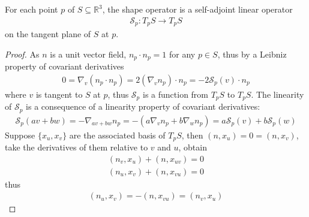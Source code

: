 \documentclass[10pt]{article}
\begin{document}
		\begin{proposition}
			For each point $p$ of $S\subseteq\mathbb{R}^3$, the shape operator is a self-adjoint linear operator
			\begin{equation*}
				\begin{aligned}
					\mathcal{S}_p: T_pS\rightarrow T_pS
				\end{aligned}
			\end{equation*}
			on the tangent plane of $S$ at $p$.
		\end{proposition}
	
		\begin{proof}
			As $n$ is a unit vector field, $n_p\cdot n_p = 1$ for any $p\in S$, thus by a Leibniz property of covariant derivatives
			\begin{equation*}
				\begin{aligned}
					0 = \nabla_v(n_p\cdot n_p) = 2(\nabla_vn_p)\cdot n_p = -2\mathcal{S}_p(v)\cdot n_p
				\end{aligned}
			\end{equation*}
			where $v$ is tangent to $S$ at $p$, thus $\mathcal{S}_p$ is a function from $T_pS$ to $T_pS$. The linearity of $\mathcal{S}_p$ is a consequence of a linearity property of covariant derivatives:
			\begin{equation*}
				\begin{aligned}
					\mathcal{S}_p(av+bw) = -\nabla_{av+bw}n_p = -(a\nabla_vn_p + b\nabla_wn_p) = a\mathcal{S}_p(v) + b\mathcal{S}_p(w)
				\end{aligned}
			\end{equation*}
                Suppose $\{x_u, x_v\}$ are the associated basis of $T_pS$, then $(n, x_u) = 0 = (n, x_v)$, take the derivatives of them relative to $v$ and $u$, obtain
                \begin{equation*}
                    \begin{aligned}
                        (n_v, x_u) + (n, x_{uv}) = 0 \\
                        (n_u, x_v) + (n, x_{vu}) = 0
                    \end{aligned}
                \end{equation*}
                thus
                \begin{equation*}
                    \begin{aligned}
                        (n_u, x_v) = -(n, x_{vu}) = (n_v, x_u)
                    \end{aligned}
                \end{equation*}
		\end{proof}
\end{document}
